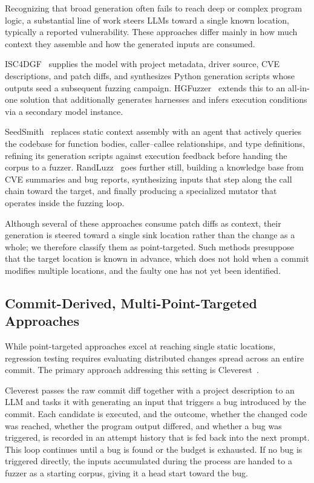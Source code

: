 Recognizing that broad generation often fails to reach deep or complex program
logic, a substantial line of work steers \acp{LLM} toward a single known
location, typically a reported vulnerability. These approaches differ mainly in
how much context they assemble and how the generated inputs are consumed.

ISC4DGF~\cite{xuISC4DGFEnhancingDirected2024} supplies the model with project
metadata, driver source, CVE descriptions, and patch diffs, and synthesizes
Python generation scripts whose outputs seed a subsequent fuzzing campaign.
HGFuzzer~\cite{xuDirectedGreyboxFuzzing2025} extends this to an all-in-one
solution that additionally generates harnesses and infers execution conditions
via a secondary model instance.

SeedSmith~\cite{zhuSeedSmithLLMDrivenSeed2026} replaces static context assembly
with an agent that actively queries the codebase for function bodies,
caller--callee relationships, and type definitions, refining its generation
scripts against execution feedback before handing the corpus to a fuzzer.
RandLuzz~\cite{fengFuzzingRandomnessReasoning2025} goes further still, building a
knowledge base from CVE summaries and bug reports, synthesizing inputs that step
along the call chain toward the target, and finally producing a specialized
mutator that operates inside the fuzzing loop.

Although several of these approaches consume patch diffs as context, their
generation is steered toward a single sink location rather than the change as a
whole; we therefore classify them as point-targeted. Such methods presuppose
that the target location is known in advance, which does not hold when a commit
modifies multiple locations, and the faulty one has not yet been identified.

\subsection{Commit-Derived, Multi-Point-Targeted Approaches}
\label{subsec:rw-commit-aware}

While point-targeted approaches excel at reaching single static locations,
regression testing requires evaluating distributed changes spread across an
entire commit. The primary approach addressing this setting is
Cleverest~\cite{liuEvaluatingLLMBasedRegression2026}.

Cleverest passes the raw commit diff together with a project description to an
\ac{LLM} and tasks it with generating an input that triggers a bug introduced by
the commit. Each candidate is executed, and the outcome, whether the changed
code was reached, whether the program output differed, and whether a bug was
triggered, is recorded in an attempt history that is fed back into the next
prompt. This loop continues until a bug is found or the budget is exhausted. If
no bug is triggered directly, the inputs accumulated during the process are
handed to a fuzzer as a starting corpus, giving it a head start toward the bug.

